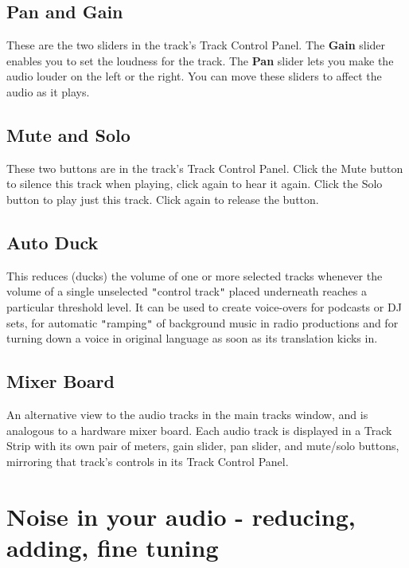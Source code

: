 \documentclass[twocolumn]{book}
\begin{document}
\subsection{Pan and Gain}


These are the two sliders in the track's Track Control Panel. The \textbf{Gain} slider enables you to set the loudness for the track.  The \textbf{Pan} slider lets you make the audio louder on the left or the right. You can move these sliders to affect the audio as it plays.

\subsection{Mute and Solo}


These two buttons are in the track's Track Control Panel. Click the Mute button to silence this track when playing, click again to hear it again. Click the Solo button to play just this track. Click again to release the button. 

\subsection{Auto Duck}


This reduces (ducks) the volume of one or more selected tracks whenever the volume of a single unselected \texttt{{}"{}}control track\texttt{{}"{}} placed underneath reaches a particular threshold level. It can be used to create voice-overs for podcasts or DJ sets, for automatic \texttt{{}"{}}ramping\texttt{{}"{}} of background music in radio productions and for turning down a voice in original language as soon as its translation kicks in.

\subsection{Mixer Board}


An alternative view to the audio tracks in the main tracks window, and is analogous to a hardware mixer board. Each audio track is displayed in a Track Strip with its own pair of meters, gain slider, pan slider, and mute/solo buttons, mirroring that track's controls in its Track Control Panel. 



\section{Noise in your audio - reducing, adding, fine tuning}
\end{document}
